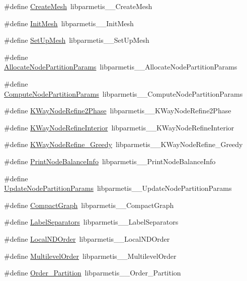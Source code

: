 \begin{DoxyCompactItemize}
\item 
\#define \hyperlink{a00960_a95dc343080e795f30023259286bf433f}{Create\+Mesh}~libparmetis\+\_\+\+\_\+\+Create\+Mesh
\item 
\#define \hyperlink{a00960_a692a40ec79439397410eb3d99f94a53d}{Init\+Mesh}~libparmetis\+\_\+\+\_\+\+Init\+Mesh
\item 
\#define \hyperlink{a00960_aee544fa951b5041aaf877d469641f9ab}{Set\+Up\+Mesh}~libparmetis\+\_\+\+\_\+\+Set\+Up\+Mesh
\item 
\#define \hyperlink{a00960_a95debf6ec42322c091a57c0c19b39aef}{Allocate\+Node\+Partition\+Params}~libparmetis\+\_\+\+\_\+\+Allocate\+Node\+Partition\+Params
\item 
\#define \hyperlink{a00960_ac9aede3a7c47db53f62eae56dc428a6c}{Compute\+Node\+Partition\+Params}~libparmetis\+\_\+\+\_\+\+Compute\+Node\+Partition\+Params
\item 
\#define \hyperlink{a00960_a38c0fb87e197ed637b207fd92fc51375}{K\+Way\+Node\+Refine2\+Phase}~libparmetis\+\_\+\+\_\+\+K\+Way\+Node\+Refine2\+Phase
\item 
\#define \hyperlink{a00960_ad4652882a502f66e947ee15fc36f8809}{K\+Way\+Node\+Refine\+Interior}~libparmetis\+\_\+\+\_\+\+K\+Way\+Node\+Refine\+Interior
\item 
\#define \hyperlink{a00960_a8f1b9d01c7074d16718074800281c2cb}{K\+Way\+Node\+Refine\+\_\+\+Greedy}~libparmetis\+\_\+\+\_\+\+K\+Way\+Node\+Refine\+\_\+\+Greedy
\item 
\#define \hyperlink{a00960_a8333e2ae4489ba8466a48ec36752605a}{Print\+Node\+Balance\+Info}~libparmetis\+\_\+\+\_\+\+Print\+Node\+Balance\+Info
\item 
\#define \hyperlink{a00960_a60c31301c6302ccfafcdd619b7616504}{Update\+Node\+Partition\+Params}~libparmetis\+\_\+\+\_\+\+Update\+Node\+Partition\+Params
\item 
\#define \hyperlink{a00960_a266afb3044d01bc7e533ae56d9513eb7}{Compact\+Graph}~libparmetis\+\_\+\+\_\+\+Compact\+Graph
\item 
\#define \hyperlink{a00960_a4d409f5a91ec8958804f6088efd4490e}{Label\+Separators}~libparmetis\+\_\+\+\_\+\+Label\+Separators
\item 
\#define \hyperlink{a00960_a7dbb4cf66c25b4312679fcf054a9dec9}{Local\+N\+D\+Order}~libparmetis\+\_\+\+\_\+\+Local\+N\+D\+Order
\item 
\#define \hyperlink{a00960_a2e9e875e784896049d1de7194d59044c}{Multilevel\+Order}~libparmetis\+\_\+\+\_\+\+Multilevel\+Order
\item 
\#define \hyperlink{a00960_a0a6eba99a09b38d1b4035c58107adb3b}{Order\+\_\+\+Partition}~libparmetis\+\_\+\+\_\+\+Order\+\_\+\+Partition

\end{DoxyCompactItemize}
